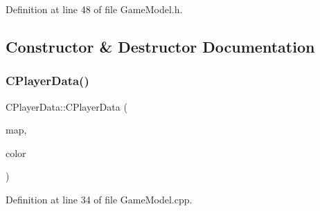 Definition at line 48 of file Game\+Model.\+h.



\subsection{Constructor \& Destructor Documentation}
\hypertarget{classCPlayerData_af60332b967ddb3044bd71376656bcdc0}{}\label{classCPlayerData_af60332b967ddb3044bd71376656bcdc0} 
\subsubsection{\texorpdfstring{C\+Player\+Data()}{CPlayerData()}}
{\footnotesize\ttfamily C\+Player\+Data\+::\+C\+Player\+Data (\begin{DoxyParamCaption}\item[{std\+::shared\+\_\+ptr$<$ \hyperlink{classCAssetDecoratedMap}{C\+Asset\+Decorated\+Map} $>$}]{map,  }\item[{\hyperlink{GameDataTypes_8h_aafb0ca75933357ff28a6d7efbdd7602f}{E\+Player\+Color}}]{color }\end{DoxyParamCaption})}



Definition at line 34 of file Game\+Model.\+cpp.


